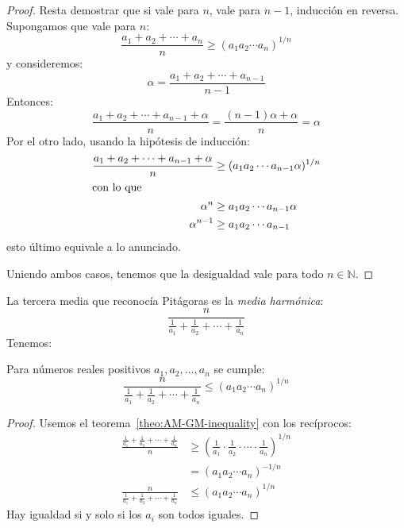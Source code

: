 \begin{proof}
    Resta demostrar que si vale para \(n\),
    vale para \(n - 1\),
    inducción en reversa.
    Supongamos que vale para \(n\):
    \begin{equation*}
      \frac{a_1 + a_2 + \dotsb +a_n}{n}
	\ge (a_1 a_2 \dotsm a_n)^{1 / n}
    \end{equation*}
    y consideremos:
    \begin{equation*}
      \alpha
	= \frac{a_1 + a_2 + \dotsb + a_{n - 1}}{n - 1}
    \end{equation*}
    Entonces:
    \begin{equation*}
      \frac{a_1 + a_2 + \dotsb + a_{n - 1} + \alpha}{n}
	= \frac{(n - 1) \alpha + \alpha}{n}
	= \alpha
    \end{equation*}
    Por el otro lado,
    usando la hipótesis de inducción:
    \begin{align*}
      \frac{a_1 + a_2 + \dotsb + a_{n - 1} + \alpha}{n}
	&\ge (a_1 a_2 \dotsm a_{n - 1} \alpha)^{1 / n} \\
      \intertext{con lo que}
      \alpha^n
	&\ge a_1 a_2 \dotsm a_{n - 1} \alpha \\
      \alpha^{n - 1}
	&\ge a_1 a_2 \dotsm a_{n - 1}
    \end{align*}
    esto último equivale a lo anunciado.

    Uniendo ambos casos,
    tenemos que la desigualdad vale para todo \(n \in \mathbb{N}\).
  \end{proof}
  La tercera media que reconocía Pitágoras%
  es la \emph{media harmónica}:%
  \begin{equation}
    \label{eq:harmonic-mean}
    \frac{n}{\frac{1}{a_1} + \frac{1}{a_2} + \dotsb + \frac{1}{a_n}}
  \end{equation}
  Tenemos:
  \begin{theorem}
    \label{theo:GM-HM-inequality}
    Para números reales positivos
    \(a_1, a_2, \dotsc, a_n\)
    se cumple:
    \begin{equation*}
      \frac{n}{\frac{1}{a_1}
	  + \frac{1}{a_2} + \dotsb + \frac{1}{a_n}}
	\le (a_1 a_2 \dotsm a_n)^{1/n}
    \end{equation*}
  \end{theorem}
  \begin{proof}
    Usemos el teorema~\ref{theo:AM-GM-inequality}
    con los recíprocos:
    \begin{align*}
      \frac{\frac{1}{a_1}
	  + \frac{1}{a_2} + \dotsb + \frac{1}{a_n}}{n}
	&\ge \left(
		\frac{1}{a_1} \cdot \frac{1}{a_2}
		  \cdot \dotsb \cdot \frac{1}{a_n}
	     \right)^{1/n} \\
	&= (a_1 a_2 \dotsb a_n)^{-1/n} \\
      \frac{n}{\frac{1}{a_1}
		 + \frac{1}{a_2}
		 + \dotsb
		 + \frac{1}{a_n}}
	&\le (a_1 a_2 \dotsb a_n)^{1/n}
    \end{align*}
    Hay igualdad si y solo si los \(a_i\) son todos iguales.
  \end{proof}

